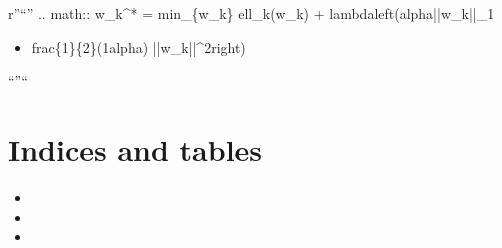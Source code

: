 \documentclass[letterpaper,10pt,english]{sphinxmanual}
\begin{document}
\sphinxAtStartPar
r”“”
.. math:: w\_k\textasciicircum{}* = min\_\{w\_k\} ell\_k(w\_k) + lambdaleft(alpha||w\_k||\_1
\begin{itemize}
\item {} 
\sphinxAtStartPar
frac\{1\}\{2\}(1\sphinxhyphen{}alpha) ||w\_k||\textasciicircum{}2right)

\end{itemize}

\sphinxAtStartPar
“”“


\chapter{Indices and tables}
\label{\detokenize{index:indices-and-tables}}\begin{itemize}
\item {} 
\sphinxAtStartPar
{}

\item {} 
\sphinxAtStartPar
{}

\item {} 
\sphinxAtStartPar
{}

\end{itemize}



\renewcommand{\indexname}{Index}
\printindex
\end{document}
